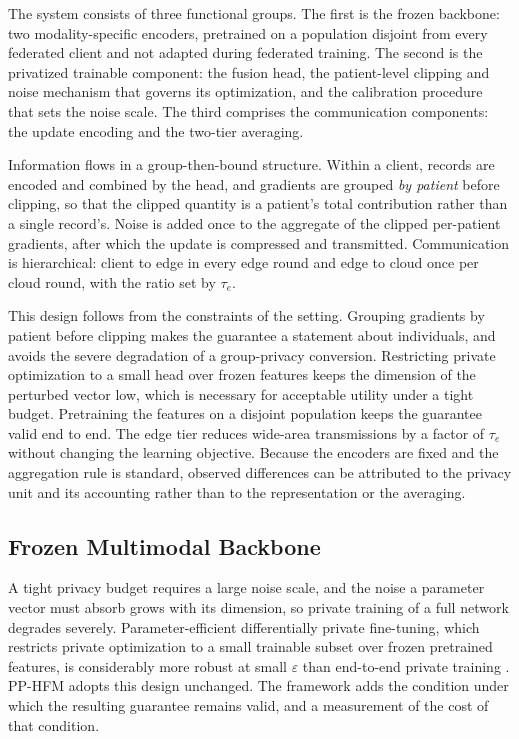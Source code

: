 The system consists of three functional groups. The first is the frozen
backbone: two modality-specific encoders, pretrained on a population disjoint
from every federated client and not adapted during federated training. The
second is the privatized trainable component: the fusion head, the
patient-level clipping and noise mechanism that governs its optimization, and
the calibration procedure that sets the noise scale. The third comprises the
communication components: the update encoding and the two-tier averaging.

Information flows in a group-then-bound structure. Within a client, records
are encoded and combined by the head, and gradients are grouped \emph{by
patient} before clipping, so that the clipped quantity is a patient's total
contribution rather than a single record's. Noise is added once to the
aggregate of the clipped per-patient gradients, after which the update is
compressed and transmitted. Communication is hierarchical: client to edge in
every edge round and edge to cloud once per cloud round, with the ratio set by
$\tau_e$.

This design follows from the constraints of the setting. Grouping gradients by
patient before clipping makes the guarantee a statement about individuals, and
avoids the severe degradation of a group-privacy conversion. Restricting
private optimization to a small head over frozen features keeps the dimension
of the perturbed vector low, which is necessary for acceptable utility under a
tight budget. Pretraining the features on a disjoint population keeps the
guarantee valid end to end. The edge tier reduces wide-area transmissions by a
factor of $\tau_e$ without changing the learning objective. Because the
encoders are fixed and the aggregation rule is standard, observed differences
can be attributed to the privacy unit and its accounting rather than to the
representation or the averaging.

\subsection{Frozen Multimodal Backbone}
\label{sec:method:backbone}

A tight privacy budget requires a large noise scale, and the noise a parameter
vector must absorb grows with its dimension, so private training of a full
network degrades severely. Parameter-efficient differentially private
fine-tuning, which restricts private optimization to a small trainable subset
over frozen pretrained features, is considerably more robust at small
$\varepsilon$ than end-to-end private training \cite{ref12, ref13}. PP-HFM
adopts this design unchanged. The framework adds the condition under which the
resulting guarantee remains valid, and a measurement of the cost of that
condition.

